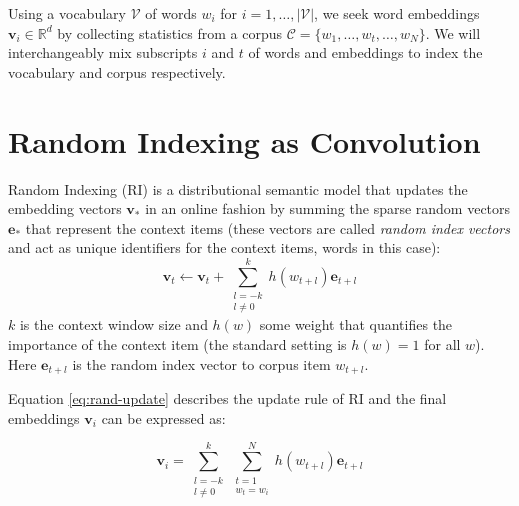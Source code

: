 \documentclass[11pt]{article}
\begin{document}
Using a vocabulary $\mathcal{V}$ of words $w_i$ for $i=1,\dots,|\mathcal{V}|$, we seek word embeddings $\textbf{v}_i \in \mathbb{R}^d$ by collecting statistics from a corpus $\mathcal{C} = \{w_1, \dots, w_t, \dots, w_N\}$. We will interchangeably mix subscripts $i$ and $t$ of words and embeddings to index the vocabulary and corpus respectively.

\section{Random Indexing as Convolution}

Random Indexing (RI) \cite{Kanerva:2000,Kanerva:2009} is a distributional semantic model that updates the embedding vectors $\textbf{v}_*$ in an online fashion by summing the sparse random vectors $\textbf{e}_*$ that represent the context items (these vectors are called {\em random index vectors} and act as unique identifiers for the context items, words in this case):
\begin{equation}
    \label{eq:rand-update}
    \textbf{v}_t \leftarrow \textbf{v}_t + \sum_{\substack{l = -k\\l\neq 0}}^{k} h(w_{t+l})\textbf{e}_{t+l}
\end{equation}
$k$ is the context window size and $h(w)$ some weight that quantifies the importance of the context item (the standard setting is $h(w)=1$ for all $w$). Here $\textbf{e}_{t+l}$ is the random index vector to corpus item $w_{t+l}$.
%
%

Equation \eqref{eq:rand-update} describes the update rule of RI and the final embeddings $\mathbf{v}_i$ can be expressed as:

\begin{equation}
    \label{eq:rand-final}
    \textbf{v}_i = \displaystyle\sum\limits_{\substack{l = -k \\ l \neq 0}}^k\displaystyle\sum\limits_{\substack{t = 1 \\ w_t = w_i}}^N h(w_{t+l})\textbf{e}_{t+l}
\end{equation}
\end{document}
